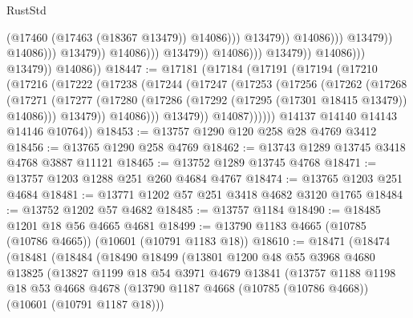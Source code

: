 \begin{lexlean}{RustStd}
\begin{coremodule}
                                                                  (@17460
                                                                    (@17463 (@18367 @13479))
                                                                    @14086)))
                                                              @13479))
                                                          @14086)))
                                                    @13479))
                                                @14086)))
                                          @13479))
                                      @14086)))
                                @13479))
                            @14086)))
                      @13479))
                  @14086)))
            @13479))
        @14086))
@18447 := @17181
    (@17184
      (@17191
        (@17194
          (@17210
            (@17216
              (@17222
                (@17238
                  (@17244
                    (@17247
                      (@17253
                        (@17256
                          (@17262
                            (@17268
                              (@17271
                                (@17277
                                  (@17280 (@17286 (@17292 (@17295 (@17301 @18415 @13479)) @14086)))
                                  @13479))
                              @14086)))
                        @13479))
                    @14087))))))
        @14137
        @14140
        @14143
        @14146
        @10764))
@18453 := @13757 @1290 @120 @258 @28 @4769 @3412
@18456 := @13765 @1290 @258 @4769
@18462 := @13743 @1289 @13745 @3418 @4768 @3887 @11121
@18465 := @13752 @1289 @13745 @4768
@18471 := @13757 @1203 @1288 @251 @260 @4684 @4767
@18474 := @13765 @1203 @251 @4684
@18481 := @13771 @1202 @57 @251 @3418 @4682 @3120 @1765
@18484 := @13752 @1202 @57 @4682
@18485 := @13757 @1184
@18490 := @18485 @1201 @18 @56 @4665 @4681
@18499 := @13790 @1183 @4665 (@10785 (@10786 @4665)) (@10601 (@10791 @1183 @18))
@18610 := @18471
    (@18474
      (@18481
        (@18484
          (@18490
            @18499
            (@13801
              @1200
              @48
              @55
              @3968
              @4680
              @13825
              (@13827
                @1199
                @18
                @54
                @3971
                @4679
                @13841
                (@13757
                  @1188
                  @1198
                  @18
                  @53
                  @4668
                  @4678
                  (@13790 @1187 @4668 (@10785 (@10786 @4668)) (@10601 (@10791 @1187 @18)))

\end{coremodule}
\end{lexlean}
